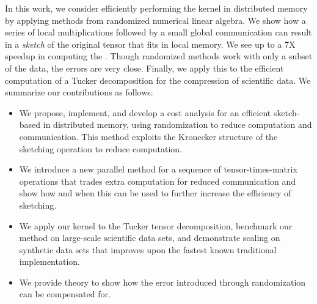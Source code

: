 In this work, we consider efficiently performing the \MTFSBC kernel in distributed memory by applying methods 
from randomized numerical linear algebra. We show how a series of local multiplications followed by a small 
global communication can result in a \emph{sketch} of the original tensor that fits in local memory. 
We see up to a 7X speedup in computing the \MTFSBC.
Though randomized methods work with only a subset of the data, the errors are very close.
Finally, we apply this to the efficient computation of a Tucker decomposition for the compression of scientific data.
We summarize our contributions as follows:
\begin{itemize}
  \item We propose, implement, and develop a cost analysis for an efficient sketch-based \MTFSBC in 
  distributed memory, using randomization to reduce computation and communication. This method exploits the Kronecker structure of the sketching operation to reduce computation.
  \item We introduce a new parallel method for a sequence of tensor-times-matrix operations that trades extra computation for reduced communication and show how and when this can be used to further increase the efficiency of sketching. 
  \item We apply our kernel to the Tucker tensor decomposition, benchmark our method on large-scale scientific 
  data sets, and demonstrate scaling on synthetic data sets that improves upon the fastest known 
  traditional implementation.
  \item We provide theory to show how the error introduced through randomization can be compensated for.
\end{itemize}